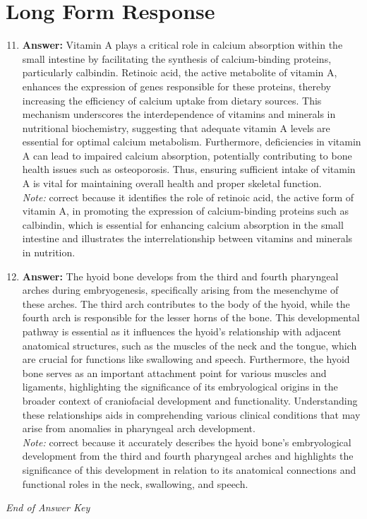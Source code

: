 \documentclass[12pt]{article}
\begin{document}
\section*{Long Form Response}
\begin{enumerate}[label=\arabic*.]
\setcounter{enumi}{10}
\item \textbf{Answer:} Vitamin A plays a critical role in calcium absorption within the small intestine by facilitating the synthesis of calcium-binding proteins, particularly calbindin. Retinoic acid, the active metabolite of vitamin A, enhances the expression of genes responsible for these proteins, thereby increasing the efficiency of calcium uptake from dietary sources. This mechanism underscores the interdependence of vitamins and minerals in nutritional biochemistry, suggesting that adequate vitamin A levels are essential for optimal calcium metabolism. Furthermore, deficiencies in vitamin A can lead to impaired calcium absorption, potentially contributing to bone health issues such as osteoporosis. Thus, ensuring sufficient intake of vitamin A is vital for maintaining overall health and proper skeletal function.
\\ \textit{Note:} correct because it identifies the role of retinoic acid, the active form of vitamin A, in promoting the expression of calcium-binding proteins such as calbindin, which is essential for enhancing calcium absorption in the small intestine and illustrates the interrelationship between vitamins and minerals in nutrition.
\item \textbf{Answer:} The hyoid bone develops from the third and fourth pharyngeal arches during embryogenesis, specifically arising from the mesenchyme of these arches. The third arch contributes to the body of the hyoid, while the fourth arch is responsible for the lesser horns of the bone. This developmental pathway is essential as it influences the hyoid's relationship with adjacent anatomical structures, such as the muscles of the neck and the tongue, which are crucial for functions like swallowing and speech. Furthermore, the hyoid bone serves as an important attachment point for various muscles and ligaments, highlighting the significance of its embryological origins in the broader context of craniofacial development and functionality. Understanding these relationships aids in comprehending various clinical conditions that may arise from anomalies in pharyngeal arch development.
\\ \textit{Note:} correct because it accurately describes the hyoid bone's embryological development from the third and fourth pharyngeal arches and highlights the significance of this development in relation to its anatomical connections and functional roles in the neck, swallowing, and speech.
\end{enumerate}

\vfill
\noindent\textit{End of Answer Key}
\end{document}

